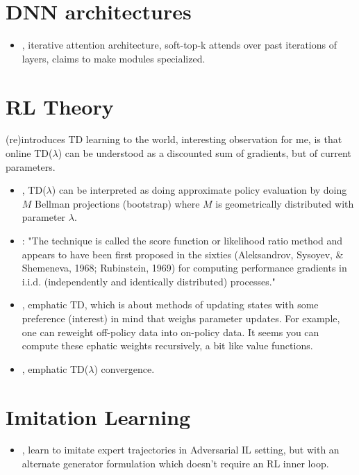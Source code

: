 \section{DNN architectures}

  
\begin{itemize}
  \item \citet{lamb2020neural}, iterative attention architecture, soft-top-k attends over past iterations of layers, claims to make modules specialized.
\end{itemize}

\section{RL Theory}

\citet{sutton1988learning} (re)introduces TD learning to the world, interesting observation for me, is that online TD($\lambda$) can be understood as a discounted sum of gradients, but of current parameters.

\begin{itemize}
  \item \citet{bertsekas1996temporal}, TD($\lambda$) can be interpreted as doing approximate policy evaluation by doing $M$ Bellman projections (bootstrap) where $M$ is geometrically distributed with parameter $\lambda$.
\item \citet{baxter2001infinite}: "The technique  is called the score function or likelihood ratio method and appears to have been first proposed in the sixties (Aleksandrov, Sysoyev, & Shemeneva, 1968; Rubinstein, 1969) for computing performance gradients in i.i.d. (independently and identically distributed) processes."
  \item \citet{mahmood2015emphatic}, emphatic TD, which is about methods of updating states with some preference (interest) in mind that weighs parameter updates. For example, one can reweight off-policy data into on-policy data. It seems you can compute these ephatic weights recursively, a bit like value functions.  
  \item \citet{yu2015convergence}, emphatic TD($\lambda$) convergence.
\end{itemize}


\section{Imitation Learning}

\begin{itemize}
  \item \citet{barde2020adversarial}, learn to imitate expert trajectories in Adversarial IL setting, but with an alternate generator formulation which doesn't require an RL inner loop.
\end{itemize}

